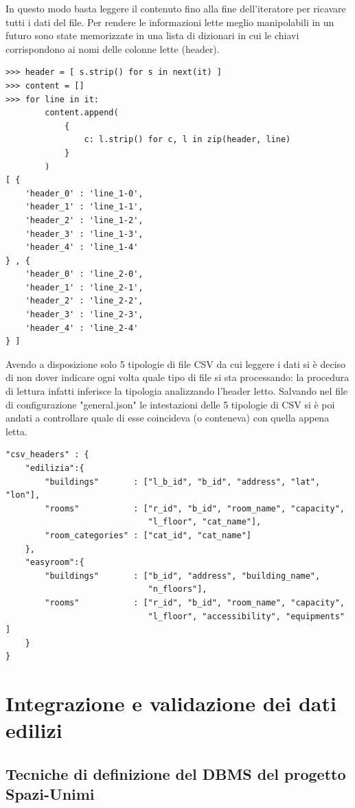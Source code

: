 \documentclass[12pt]{report}
\begin{document}
In questo modo basta leggere il contenuto fino alla fine dell'iteratore per ricavare tutti i dati del file. 
Per rendere le informazioni lette meglio manipolabili in un futuro sono state memorizzate in una lista di dizionari in cui le chiavi corrispondono ai nomi delle colonne lette (header).
\begin{lstlisting}[label=codice,caption=Memorizzazione dei dati in un dizionario, frame=single]
>>> header = [ s.strip() for s in next(it) ]
>>> content = []
>>> for line in it:
        content.append(
            {
                c: l.strip() for c, l in zip(header, line)
            }
        )
[ {
    'header_0' : 'line_1-0', 
    'header_1' : 'line_1-1', 
    'header_2' : 'line_1-2', 
    'header_3' : 'line_1-3', 
    'header_4' : 'line_1-4'
} , {
    'header_0' : 'line_2-0', 
    'header_1' : 'line_2-1', 
    'header_2' : 'line_2-2', 
    'header_3' : 'line_2-3', 
    'header_4' : 'line_2-4'
} ]
\end{lstlisting}

Avendo a disposizione solo 5 tipologie di file CSV da cui leggere i dati si è deciso di non dover indicare ogni volta quale tipo di file si sta processando: la procedura di lettura infatti inferisce la tipologia analizzando l'header letto.
Salvando nel file di configurazione "general.json" le intestazioni delle 5 tipologie di CSV si è poi andati a controllare quale di esse coincideva (o conteneva) con quella appena letta.
\begin{lstlisting}[label=codice,caption=Tipologie di header memorizzate in "'general.json'", frame=single]
"csv_headers" : {
    "edilizia":{
        "buildings"       : ["l_b_id", "b_id", "address", "lat", "lon"],
        "rooms"           : ["r_id", "b_id", "room_name", "capacity",
                             "l_floor", "cat_name"],
        "room_categories" : ["cat_id", "cat_name"]
    },
    "easyroom":{
        "buildings"       : ["b_id", "address", "building_name",
                             "n_floors"],
        "rooms"           : ["r_id", "b_id", "room_name", "capacity",
                             "l_floor", "accessibility", "equipments" ]
    }
}
\end{lstlisting}


\chapter{Integrazione e validazione dei dati edilizi}
\label{cap2}

\section{Tecniche di definizione del DBMS del progetto Spazi-Unimi}
\end{document}
